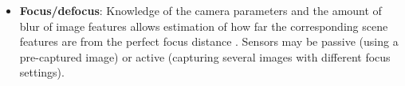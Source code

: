 \documentclass[twocolumn,oneside]{book}
\begin{document}
\begin{itemize}


\item {\bf Focus/defocus}: 
Knowledge of the camera parameters and the amount of blur of image features
allows estimation of how far the corresponding scene features are from the 
perfect focus distance \cite{nayar}. Sensors may be passive (using a pre-captured
image) or active (capturing several images with different focus settings).


\end{itemize}
\end{document}

